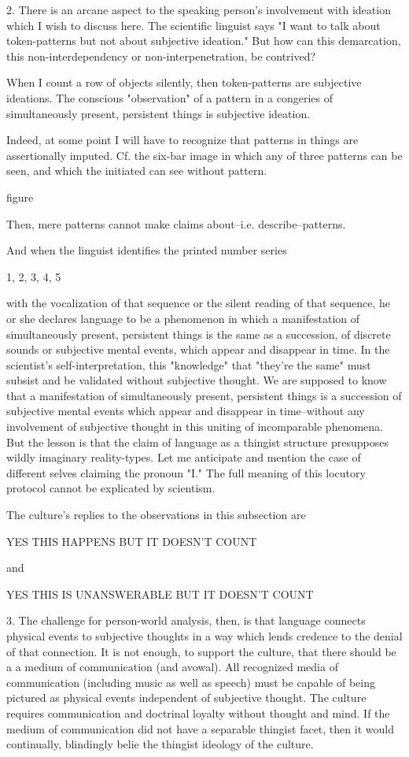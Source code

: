 2. There is an arcane aspect to the speaking person's involvement with ideation which I wish to discuss here. The scientific linguist says "I want to talk about token-patterns but not about subjective ideation." But how can this demarcation, this non-interdependency or non-interpenetration, be contrived?

When I count a row of objects silently, then token-patterns are subjective ideations. The conscious "observation" of a pattern in a congeries of simultaneously present, persistent things is subjective ideation.

Indeed, at some point I will have to recognize that patterns in things are assertionally imputed. Cf. the six-bar image in which any of three patterns can be seen, and which the initiated can see without pattern.

figure

Then, mere patterns cannot make claims about--i.e. describe--patterns.

And when the linguist identifies the printed number series

1, 2, 3, 4, 5

with the vocalization of that sequence or the silent reading of that sequence, he or she declares language to be a phenomenon in which a manifestation of simultaneously present, persistent things is the same as a succession, of discrete sounds or subjective mental events, which appear and disappear in time. In the scientist's self-interpretation, this "knowledge" that "they're the same" must subsist and be validated without subjective thought. We are supposed to know that a manifestation of simultaneously present, persistent things is a succession of subjective mental events which appear and disappear in time--without any involvement of subjective thought in this uniting of incomparable phenomena. But the lesson is that the claim of language as a thingist structure presupposes wildly imaginary reality-types. Let me anticipate and mention the case of different selves claiming the pronoun "I." The full meaning of this locutory protocol cannot be explicated by scientism.

The culture's replies to the observations in this subsection are

    YES THIS HAPPENS BUT IT DOESN'T COUNT

and

    YES THIS IS UNANSWERABLE BUT IT DOESN'T COUNT 

3. The challenge for person-world analysis, then, is that language connects physical events to subjective thoughts in a way which lends credence to the denial of that connection. It is not enough, to support the culture, that there should be a a medium of communication (and avowal). All recognized media of communication (including music as well as speech) must be capable of being pictured as physical events independent of subjective thought. The culture requires communication and doctrinal loyalty without thought and mind. If the medium of communication did not have a separable thingist facet, then it would continually, blindingly belie the thingist ideology of the culture.

